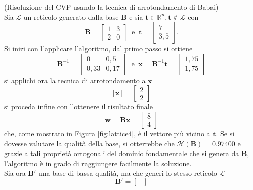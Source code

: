 \begin{exmp}
    (Risoluzione del CVP usando la tecnica di arrotondamento di Babai)
    \\
    Sia $\mathcal{L}$ un reticolo generato dalla base $\mathbf{B}$ 
    e sia $\mathbf{t} \in \mathbb{R}^n, \mathbf{t} \notin \mathcal{L}$ con
    \[
        \mathbf{B} =
        \begin{bmatrix}
            1 & 3\\
            2 & 0
        \end{bmatrix}
        \ \text{ e } \ \mathbf{t} =
        \begin{bmatrix}
            7\\
            3,5
        \end{bmatrix}.
    \]
    Si inizi con l'applicare l'algoritmo, dal primo passo si ottiene
    \[
        \mathbf{B}^{-1} =
        \begin{bmatrix}
            0 & 0,5\\
            0,33 & 0,17
        \end{bmatrix}
        \ \text{ e } \ \mathbf{x} = \mathbf{B}^{-1}\mathbf{t} = 
        \begin{bmatrix}
            1,75\\
            1,75
        \end{bmatrix}
    \]
    si applichi ora la tecnica di arrotondamento a $\mathbf{x}$
    \[
        \lfloor\mathbf{x}\rceil = 
        \begin{bmatrix}
            2\\
            2
        \end{bmatrix}
    \]
    si proceda infine con l'ottenere il risultato finale
    \[
        \mathbf{w} = \mathbf{B}\mathbf{x} =
        \begin{bmatrix}
            8\\
            4
        \end{bmatrix}
    \]  
    che, come mostrato in Figura \ref*{fig:lattice4}, è il vettore più vicino
    a $\mathbf{t}$. Se si dovesse valutare la qualità della base, si otterrebbe che 
    $\mathcal{H}(\mathbf{B}) = 0.97400$ e grazie a tali proprietà ortogonali del dominio fondamentale
    che si genera da $\mathbf{B}$, l'algoritmo è in grado di raggiungere facilmente la soluzione.
    \\
    Sia ora $\mathbf{B}'$ una base di bassa qualità, ma che generi lo stesso reticolo 
    $\mathcal{L}$
    \[
        \mathbf{B}' =
        \begin{bmatrix}

\end{bmatrix}\]
\end{exmp}
